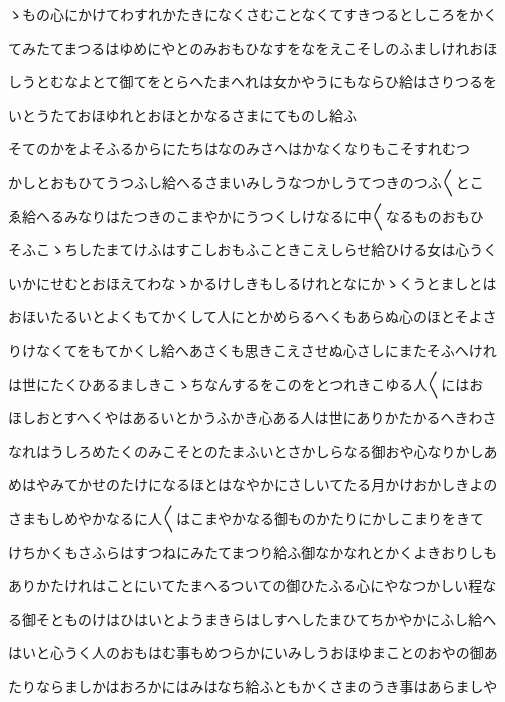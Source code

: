 \documentclass[a4paper,11pt,landscape]{ltjtarticle}
\begin{document}
\par\medskip
ゝもの心にかけてわすれかたきになくさむことなくてすきつるとしころをかく
\par\medskip
てみたてまつるはゆめにやとのみおもひなすをなをえこそしのふましけれおほ
\par\medskip
しうとむなよとて御てをとらへたまへれは女かやうにもならひ給はさりつるを
\par\medskip
いとうたておほゆれとおほとかなるさまにてものし給ふ
\par\medskip
そてのかをよそふるからにたちはなのみさへはかなくなりもこそすれむつ
\par\medskip
かしとおもひてうつふし給へるさまいみしうなつかしうてつきのつふ〱とこ
\par\medskip
ゑ給へるみなりはたつきのこまやかにうつくしけなるに中〱なるものおもひ
\par\medskip
そふこゝちしたまてけふはすこしおもふこときこえしらせ給ひける女は心うく
\par\medskip
いかにせむとおほえてわなゝかるけしきもしるけれとなにかゝくうとましとは
\par\medskip
おほいたるいとよくもてかくして人にとかめらるへくもあらぬ心のほとそよさ
\par\medskip
りけなくてをもてかくし給へあさくも思きこえさせぬ心さしにまたそふへけれ
\par\medskip
は世にたくひあるましきこゝちなんするをこのをとつれきこゆる人〱にはお
\par\medskip
ほしおとすへくやはあるいとかうふかき心ある人は世にありかたかるへきわさ
\par\medskip
なれはうしろめたくのみこそとのたまふいとさかしらなる御おや心なりかしあ
\par\medskip
めはやみてかせのたけになるほとはなやかにさしいてたる月かけおかしきよの
\par\medskip
さまもしめやかなるに人〱はこまやかなる御ものかたりにかしこまりをきて
\par\medskip
けちかくもさふらはすつねにみたてまつり給ふ御なかなれとかくよきおりしも
\par\medskip
ありかたけれはことにいてたまへるついての御ひたふる心にやなつかしい程な
\par\medskip
る御そとものけはひはいとようまきらはしすへしたまひてちかやかにふし給へ
\par\medskip
はいと心うく人のおもはむ事もめつらかにいみしうおほゆまことのおやの御あ
\par\medskip
たりならましかはおろかにはみはなち給ふともかくさまのうき事はあらましや
\par\medskip
\end{document}
